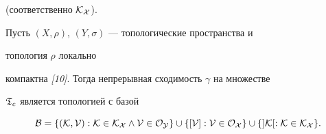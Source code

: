 (соответственно $\cal K_X$).





\begin{thm}


Пусть $(X,\rho)$, $(Y,\sigma)$ --- топологические пространства и


топология $\rho$ локально


компактна {\em [10]}. Тогда непрерывная сходимость $\gamma$ на множестве


$\frak T_c$ является топологией с базой


$$


\cal B=\{(K,V):K\in\cal K_X\wedge V\in\cal O_Y\}\cup


\{[V]:V\in\cal O_X\}\cup \{]K[:K\in\cal K_X\}.


$$


\end{thm}





